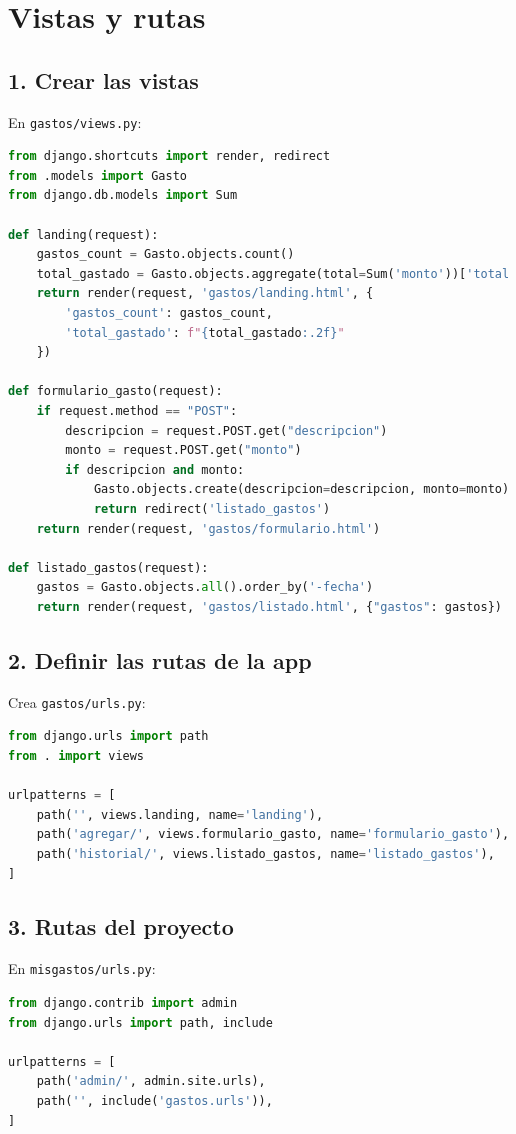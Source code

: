 \documentclass[12pt,a4paper]{article}
\begin{document}
\section{Vistas y rutas}

\subsection{1. Crear las vistas}
En \texttt{gastos/views.py}:
\begin{lstlisting}[language=Python]
from django.shortcuts import render, redirect
from .models import Gasto
from django.db.models import Sum

def landing(request):
    gastos_count = Gasto.objects.count()
    total_gastado = Gasto.objects.aggregate(total=Sum('monto'))['total'] or 0
    return render(request, 'gastos/landing.html', {
        'gastos_count': gastos_count,
        'total_gastado': f"{total_gastado:.2f}"
    })

def formulario_gasto(request):
    if request.method == "POST":
        descripcion = request.POST.get("descripcion")
        monto = request.POST.get("monto")
        if descripcion and monto:
            Gasto.objects.create(descripcion=descripcion, monto=monto)
            return redirect('listado_gastos')
    return render(request, 'gastos/formulario.html')

def listado_gastos(request):
    gastos = Gasto.objects.all().order_by('-fecha')
    return render(request, 'gastos/listado.html', {"gastos": gastos})
\end{lstlisting}

\subsection{2. Definir las rutas de la app}
Crea \texttt{gastos/urls.py}:
\begin{lstlisting}[language=Python]
from django.urls import path
from . import views

urlpatterns = [
    path('', views.landing, name='landing'),
    path('agregar/', views.formulario_gasto, name='formulario_gasto'),
    path('historial/', views.listado_gastos, name='listado_gastos'),
]
\end{lstlisting}

\subsection{3. Rutas del proyecto}
En \texttt{misgastos/urls.py}:
\begin{lstlisting}[language=Python]
from django.contrib import admin
from django.urls import path, include

urlpatterns = [
    path('admin/', admin.site.urls),
    path('', include('gastos.urls')),
]
\end{lstlisting}
\end{document}
